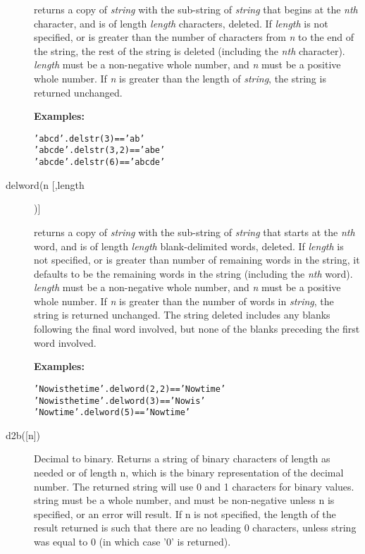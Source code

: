 \begin{description}
returns a copy of \emph{string} with the sub-string of
\emph{string} that begins at the \emph{n}\emph{th} character, and is
of length \emph{length} characters, deleted.
If \emph{length} is not specified, or is greater than the number of
characters from \emph{n} to the end of the string, the rest of the
string is deleted (including the \emph{n}\emph{th} character).
\emph{length} must be a non-negative whole number, and \emph{n}
must be a positive whole number.  If \emph{n} is greater than the
length of \emph{string}, the string is returned unchanged.
 
\textbf{Examples:}
\begin{alltt}
'abcd'.delstr(3)    == 'ab'
'abcde'.delstr(3,2) == 'abe'
'abcde'.delstr(6)   == 'abcde'
\end{alltt}
\item[delword(n [,length])]\label{refdelword}

returns a copy of \emph{string} with the sub-string of
\emph{string} that starts at the \emph{n}\emph{th} word, and is of
length \emph{length} blank-delimited words, deleted.
If \emph{length} is not specified, or is greater than number of
remaining words in the string, it defaults to be the remaining words
in the string (including the \emph{n}\emph{th} word).
\emph{length} must be a non-negative whole number, and \emph{n}
must be a positive whole number.  If \emph{n} is greater than the
number of words in \emph{string}, the string is returned unchanged.
The string deleted includes any blanks following the final word
involved, but none of the blanks preceding the first word involved.
 
\textbf{Examples:}
\begin{alltt}
'Now is the  time'.delword(2,2) == 'Now time'
'Now is the time '.delword(3)   == 'Now is '
'Now  time'.delword(5)          == 'Now  time'
\end{alltt}

\item[d2b([n{]})]\label{refd2b}
 Decimal to binary.
Returns a string of binary characters of length as needed or of length
n, which is the binary representation of the decimal number. The
returned string will use 0 and 1 characters for binary values. string
must be a whole number, and must be non-negative unless n is
specified, or an error will result. If n is not specified, the length
of the result returned is such that there are no leading 0 characters,
unless string was equal to 0 (in which case '0' is returned).


\end{description}
